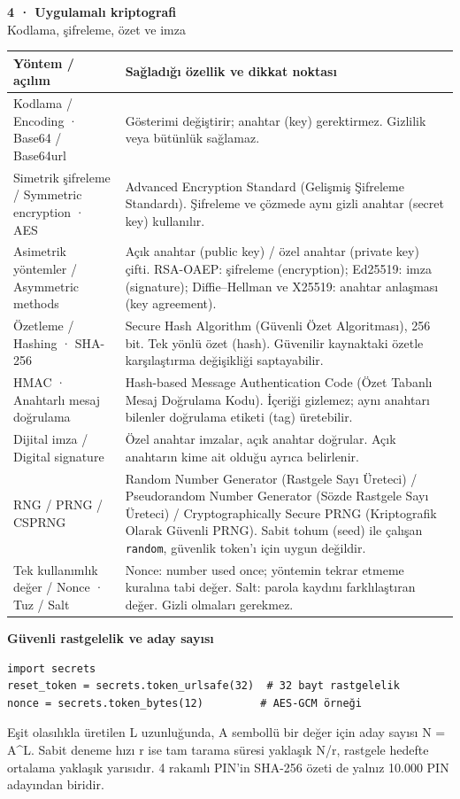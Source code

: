 \documentclass[11pt,a4paper]{article}
\newcommand{\AltBaslik}[1]{\par\vspace{3pt}\textbf{#1}\par\nobreak}
\begin{document}
\newpage
{\Large\bfseries 4 · Uygulamalı kriptografi}\\[3pt]
{\normalsize Kodlama, şifreleme, özet ve imza}\\[5pt]
\begingroup\small\begin{tabularx}{\linewidth}{@{}LY@{}}\toprule
Yöntem / açılım & Sağladığı özellik ve dikkat noktası\\\midrule
Kodlama / Encoding · Base64 / Base64url & Gösterimi değiştirir; anahtar (key) gerektirmez. Gizlilik veya bütünlük sağlamaz.\\[2pt]
Simetrik şifreleme / Symmetric encryption · AES & Advanced Encryption Standard (Gelişmiş Şifreleme Standardı). Şifreleme ve çözmede aynı gizli anahtar (secret key) kullanılır.\\[2pt]
Asimetrik yöntemler / Asymmetric methods & Açık anahtar (public key) / özel anahtar (private key) çifti. RSA-OAEP: şifreleme (encryption); Ed25519: imza (signature); Diffie–Hellman ve X25519: anahtar anlaşması (key agreement).\\[2pt]
Özetleme / Hashing · SHA-256 & Secure Hash Algorithm (Güvenli Özet Algoritması), 256 bit. Tek yönlü özet (hash). Güvenilir kaynaktaki özetle karşılaştırma değişikliği saptayabilir.\\[2pt]
HMAC · Anahtarlı mesaj doğrulama & Hash-based Message Authentication Code (Özet Tabanlı Mesaj Doğrulama Kodu). İçeriği gizlemez; aynı anahtarı bilenler doğrulama etiketi (tag) üretebilir.\\[2pt]
Dijital imza / Digital signature & Özel anahtar imzalar, açık anahtar doğrular. Açık anahtarın kime ait olduğu ayrıca belirlenir.\\[2pt]
RNG / PRNG / CSPRNG & Random Number Generator (Rastgele Sayı Üreteci) / Pseudorandom Number Generator (Sözde Rastgele Sayı Üreteci) / Cryptographically Secure PRNG (Kriptografik Olarak Güvenli PRNG). Sabit tohum (seed) ile çalışan \texttt{random}, güvenlik token’ı için uygun değildir.\\[2pt]
Tek kullanımlık değer / Nonce · Tuz / Salt & Nonce: number used once; yöntemin tekrar etmeme kuralına tabi değer. Salt: parola kaydını farklılaştıran değer. Gizli olmaları gerekmez.\\[2pt]
\bottomrule\end{tabularx}\endgroup\par
\AltBaslik{Güvenli rastgelelik ve aday sayısı}
\begin{Verbatim}[fontsize=\footnotesize,breaklines=true,breakanywhere=true,frame=lines,framesep=3mm]
import secrets
reset_token = secrets.token_urlsafe(32)  # 32 bayt rastgelelik
nonce = secrets.token_bytes(12)         # AES-GCM örneği
\end{Verbatim}
Eşit olasılıkla üretilen L uzunluğunda, A sembollü bir değer için aday sayısı N = A\textasciicircum{}L. Sabit deneme hızı r ise tam tarama süresi yaklaşık N/r, rastgele hedefte ortalama yaklaşık yarısıdır. 4 rakamlı PIN’in SHA-256 özeti de yalnız 10.000 PIN adayından biridir.
\end{document}
